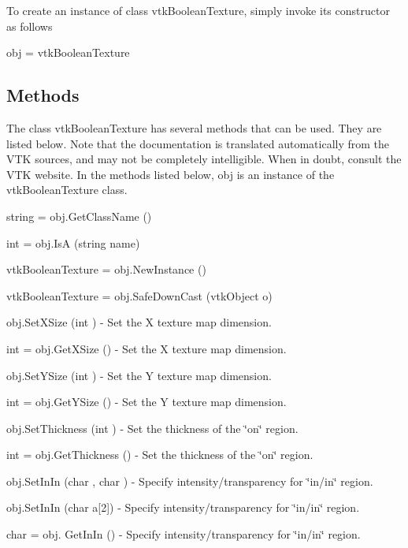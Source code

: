 To create an instance of class vtk\-Boolean\-Texture, simply invoke its constructor as follows \begin{DoxyVerb}  obj = vtkBooleanTexture
\end{DoxyVerb}
 \hypertarget{vtkwidgets_vtkxyplotwidget_Methods}{}\subsection{Methods}\label{vtkwidgets_vtkxyplotwidget_Methods}
The class vtk\-Boolean\-Texture has several methods that can be used. They are listed below. Note that the documentation is translated automatically from the V\-T\-K sources, and may not be completely intelligible. When in doubt, consult the V\-T\-K website. In the methods listed below, {\ttfamily obj} is an instance of the vtk\-Boolean\-Texture class. 
\begin{DoxyItemize}
\item {\ttfamily string = obj.\-Get\-Class\-Name ()}  
\item {\ttfamily int = obj.\-Is\-A (string name)}  
\item {\ttfamily vtk\-Boolean\-Texture = obj.\-New\-Instance ()}  
\item {\ttfamily vtk\-Boolean\-Texture = obj.\-Safe\-Down\-Cast (vtk\-Object o)}  
\item {\ttfamily obj.\-Set\-X\-Size (int )} -\/ Set the X texture map dimension.  
\item {\ttfamily int = obj.\-Get\-X\-Size ()} -\/ Set the X texture map dimension.  
\item {\ttfamily obj.\-Set\-Y\-Size (int )} -\/ Set the Y texture map dimension.  
\item {\ttfamily int = obj.\-Get\-Y\-Size ()} -\/ Set the Y texture map dimension.  
\item {\ttfamily obj.\-Set\-Thickness (int )} -\/ Set the thickness of the \char`\"{}on\char`\"{} region.  
\item {\ttfamily int = obj.\-Get\-Thickness ()} -\/ Set the thickness of the \char`\"{}on\char`\"{} region.  
\item {\ttfamily obj.\-Set\-In\-In (char , char )} -\/ Specify intensity/transparency for \char`\"{}in/in\char`\"{} region.  
\item {\ttfamily obj.\-Set\-In\-In (char a\mbox{[}2\mbox{]})} -\/ Specify intensity/transparency for \char`\"{}in/in\char`\"{} region.  
\item {\ttfamily char = obj. Get\-In\-In ()} -\/ Specify intensity/transparency for \char`\"{}in/in\char`\"{} region.  

\end{DoxyItemize}
